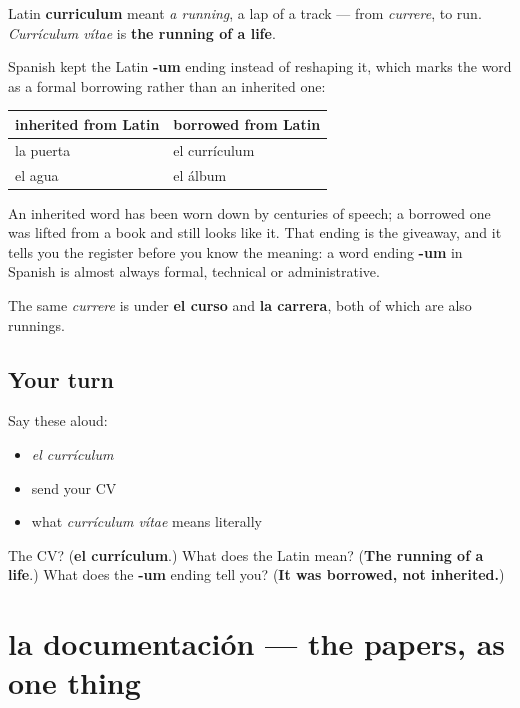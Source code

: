 \begin{cousinweb}
Latin \textbf{curriculum} meant \emph{a running}, a lap of a track — from \emph{currere}, to run. \emph{Currículum vítae} is \textbf{the running of a life}.

Spanish kept the Latin \textbf{-um} ending instead of reshaping it, which marks the word as a formal borrowing rather than an inherited one:

\noindent
\begin{tabularx}{\linewidth}{@{}>{\raggedright\arraybackslash}X>{\raggedright\arraybackslash}X@{}}
\toprule
\textbf{inherited from Latin} & \textbf{borrowed from Latin} \\
\midrule
la puerta & el currículum \\
el agua & el álbum \\
\bottomrule
\end{tabularx}

An inherited word has been worn down by centuries of speech; a borrowed one was lifted from a book and still looks like it. That ending is the giveaway, and it tells you the register before you know the meaning: a word ending \textbf{-um} in Spanish is almost always formal, technical or administrative.

The same \emph{currere} is under \textbf{el curso} and \textbf{la carrera}, both of which are also runnings.
\end{cousinweb}

\subsection*{Your turn}
Say these aloud:

\begin{itemize}
\raggedright
  \item \emph{el currículum}
  \item send your CV
  \item what \emph{currículum vítae} means literally
\end{itemize}

\begin{tcolorbox}[breakable,colback=teal!4,colframe=teal!35!black,title={Before you move on}]
The CV? (\textbf{el currículum}.) What does the Latin mean? (\textbf{The running of a life}.) What does the \textbf{-um} ending tell you? (\textbf{It was borrowed, not inherited.})
\end{tcolorbox}
\section[la documentación]{la documentación — the papers, as one thing}


